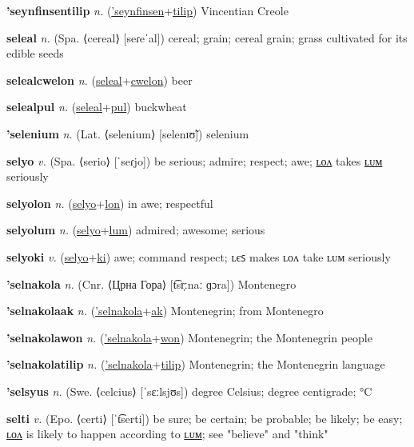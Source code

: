 \textbf{\hypertarget{'seynfinsentilip}{'seynfinsentilip}} \textit{n.} (\hyperlink{'seynfinsen}{'seynfinsen}+\allowbreak \hyperlink{tilip}{tilip})
Vincentian Creole

\textbf{\hypertarget{seleal}{seleal}} \textit{n.} (Spa. ⟨cereal⟩ [seɾeˈal])
cereal; grain; cereal grain; grass cultivated for its edible seeds

\textbf{\hypertarget{selealcwelon}{selealcwelon}} \textit{n.} (\hyperlink{seleal}{seleal}+\allowbreak \hyperlink{cwelon}{cwelon})
beer

\textbf{\hypertarget{selealpul}{selealpul}} \textit{n.} (\hyperlink{seleal}{seleal}+\allowbreak \hyperlink{pul}{pul})
buckwheat

\textbf{\hypertarget{'selenium}{'selenium}} \textit{n.} (Lat. ⟨selenium⟩ [selenɪʊ̃])
selenium

\textbf{\hypertarget{selyo}{selyo}} \textit{v.} (Spa. ⟨serio⟩ [ˈseɾjo])
be serious; admire; respect; awe; \hyperlink{selyolon}{ʟᴏᴧ} takes \hyperlink{selyolum}{ʟᴜᴍ} seriously

\textbf{\hypertarget{selyolon}{selyolon}} \textit{n.} (\hyperlink{selyo}{selyo}+\allowbreak \hyperlink{lon}{lon})
in awe; respectful

\textbf{\hypertarget{selyolum}{selyolum}} \textit{n.} (\hyperlink{selyo}{selyo}+\allowbreak \hyperlink{lum}{lum})
admired; awesome; serious

\textbf{\hypertarget{selyoki}{selyoki}} \textit{v.} (\hyperlink{selyo}{selyo}+\allowbreak \hyperlink{ki}{ki})
awe; command respect; ʟєꜱ makes ʟᴏᴧ take ʟᴜᴍ seriously

\textbf{\hypertarget{'selnakola}{'selnakola}} \textit{n.} (Cnr. ⟨Црна Гора⟩ [t͡sr̩ːnaː ɡɔra])
Montenegro

\textbf{\hypertarget{'selnakolaak}{'selnakolaak}} \textit{n.} (\hyperlink{'selnakola}{'selnakola}+\allowbreak \hyperlink{ak}{ak})
Montenegrin; from Montenegro

\textbf{\hypertarget{'selnakolawon}{'selnakolawon}} \textit{n.} (\hyperlink{'selnakola}{'selnakola}+\allowbreak \hyperlink{won}{won})
Montenegrin; the Montenegrin people

\textbf{\hypertarget{'selnakolatilip}{'selnakolatilip}} \textit{n.} (\hyperlink{'selnakola}{'selnakola}+\allowbreak \hyperlink{tilip}{tilip})
Montenegrin; the Montenegrin language

\textbf{\hypertarget{'selsyus}{'selsyus}} \textit{n.} (Swe. ⟨celcius⟩ [ˈsɛːlsjʊs])
degree Celsius; degree centigrade; °C

\textbf{\hypertarget{selti}{selti}} \textit{v.} (Epo. ⟨certi⟩ [ˈt͡serti])
be sure; be certain; be probable; be likely; be easy; \hyperlink{seltilon}{ʟᴏᴧ} is likely to happen according to \hyperlink{seltilum}{ʟᴜᴍ}; see "believe" and "think"

